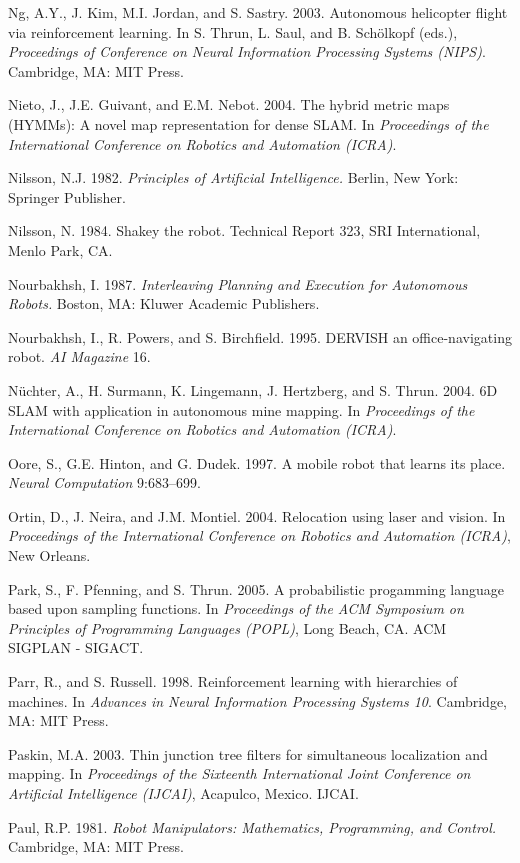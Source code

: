\documentclass[10pt,a4paper]{article}
\begin{document}
Ng, A.Y., J. Kim, M.I. Jordan, and S. Sastry. 2003. Autonomous helicopter flight via
reinforcement learning. In S. Thrun, L. Saul, and B. Schölkopf (eds.), \textit{Proceedings
of Conference on Neural Information Processing Systems (NIPS)}. Cambridge, MA: MIT
Press.

Nieto, J., J.E. Guivant, and E.M. Nebot. 2004. The hybrid metric maps (HYMMs):
A novel map representation for dense SLAM. In \textit{Proceedings of the International
Conference on Robotics and Automation (ICRA)}.

Nilsson, N.J. 1982. \textit{Principles of Artificial Intelligence.} Berlin, New York: Springer
Publisher.

Nilsson, N. 1984. Shakey the robot. Technical Report 323, SRI International, Menlo
Park, CA.

Nourbakhsh, I. 1987. \textit{Interleaving Planning and Execution for Autonomous Robots.}
Boston, MA: Kluwer Academic Publishers.

Nourbakhsh, I., R. Powers, and S. Birchfield. 1995. DERVISH an office-navigating
robot. \textit{AI Magazine }16.

Nüchter, A., H. Surmann, K. Lingemann, J. Hertzberg, and S. Thrun. 2004. 6D SLAM
with application in autonomous mine mapping. In \textit{Proceedings of the International
Conference on Robotics and Automation (ICRA)}.

Oore, S., G.E. Hinton, and G. Dudek. 1997. A mobile robot that learns its place. \textit{Neural
Computation} 9:683–699.

Ortin, D., J. Neira, and J.M. Montiel. 2004. Relocation using laser and vision. In
\textit{Proceedings of the International Conference on Robotics and Automation (ICRA)}, New
Orleans.

Park, S., F. Pfenning, and S. Thrun. 2005. A probabilistic progamming language
based upon sampling functions. In \textit{Proceedings of the ACM Symposium on Principles
of Programming Languages (POPL)}, Long Beach, CA. ACM SIGPLAN - SIGACT.

Parr, R., and S. Russell. 1998. Reinforcement learning with hierarchies of machines.
In \textit{Advances in Neural Information Processing Systems 10}. Cambridge, MA: MIT Press.

Paskin, M.A. 2003. Thin junction tree filters for simultaneous localization and mapping.
In \textit{Proceedings of the Sixteenth International Joint Conference on Artificial Intelligence
(IJCAI)}, Acapulco, Mexico. IJCAI.

Paul, R.P. 1981. \textit{Robot Manipulators: Mathematics, Programming, and Control.} Cambridge,
MA: MIT Press.
\end{document}
